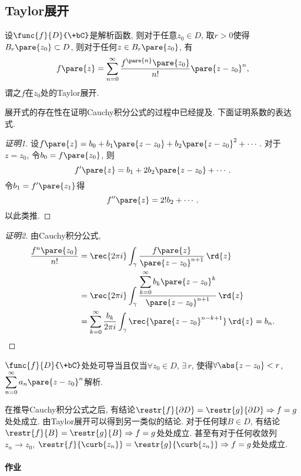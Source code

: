 \documentclass{ctexart}
\begin{document}

\subsection{Taylor展开} %
\label{sub:taylor展开}

\begin{theorem}
    设$\func{f}{D}{\+bC}$是解析函数, 则对于任意$z_0\in D$, 取$r>0$使得$B_r\pare{z_0}\subset D$, 则对于任何$z\in B_r\pare{z_0}$, 有
    \[ f\pare{z} = \sum_{n=0}^\infty \frac{f^{\pare{n}}\pare{z_0}}{n!}\pare{z-z_0}^n, \]
    谓之$f$在$z_0$处的Taylor展开.
\end{theorem}
展开式的存在性在证明Cauchy积分公式的过程中已经提及. 下面证明系数的表达式.
\begin{proof}[证明1]
    设$f\pare{z} = b_0 + b_1\pare{z-z_0} + b_2\pare{z-z_0}^2+\cdots$. 对于$z=z_0$, 令$b_0 = f\pare{z_0}$, 则
    \[ f'\pare{z} = b_1 + 2b_2\pare{z-z_0} + \cdots. \]
    令$b_1 = f'\pare{z_1}$得
    \[ f''\pare{z} = 2! b_2 + \cdots. \]
    以此类推.
\end{proof}
\begin{proof}[证明2]
    由Cauchy积分公式,
    \begin{align*}
        \frac{f^{n}\pare{z_0}}{n!} &= \rec{2\pi i} \int_\gamma \frac{f\pare{z}}{\pare{z-z_0}^{n+1}}\,\rd{z} \\
        &= \rec{2\pi i} \int_\gamma \frac{\displaystyle \sum_{k=0}^\infty b_k\pare{z-z_0}^k}{\pare{z-z_0}^{n+1}}\,\rd{z} \\
        &= \sum_{k=0}^\infty \frac{b_k}{2\pi i} \int_\gamma \rec{\pare{z-z_0}^{n-k+1}}\,\rd{z} = b_n. \qedhere
    \end{align*}
\end{proof}
\begin{theorem}
    $\func{f}{D}{\+bC}$处处可导当且仅当$\forall z_0\in D$, $\exists\, r$, 使得$\forall \abs{z-z_0}<r$, $
    \displaystyle \sum_{n=0}^\infty a_n\pare{z-z_0}^n$解析.
\end{theorem}
在推导Cauchy积分公式之后, 有结论$\restr{f}{\partial D} = \restr{g}{\partial D}\Rightarrow f = g$处处成立. 由Taylor展开可以得到另一类似的结论. 对于任何球$B\in D$, 有结论$\restr{f}{B} = \restr{g}{B}\Rightarrow f = g$处处成立. 甚至有对于任何收敛列$z_n\rightarrow z_0$, $\restr{f}{\curb{z_n}} = \restr{g}{\curb{z_n}}\Rightarrow f = g$处处成立.

\paragraph{作业} %
\label{par:作业}
\end{document}
